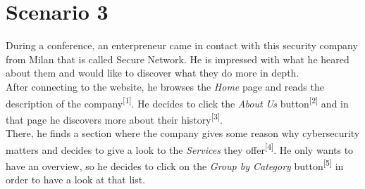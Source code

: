 \documentclass[12pt]{report}
\begin{document}
\section{Scenario 3}
During a conference, an enterpreneur came in contact with this security company from Milan that is called Secure Network.
He is impressed with what he heared about them and would like to discover what they do more in depth.
\\
\noindent
After connecting to the website, he browses the \emph{Home} page and reads the description of the company\textsuperscript{[1]}. 
He decides to click the \emph{About Us} button\textsuperscript{[2]} and in that page he discovers more about their history\textsuperscript{[3]}.
\\
\noindent
There, he finds a section where the company gives some reason why cybersecurity matters and decides to give a look to the \emph{Services} they offer\textsuperscript{[4]}.
He only wants to have an overview, so he decides to click on the \emph{Group by Category} button\textsuperscript{[5]} in order to have a look at that list.
\end{document}
